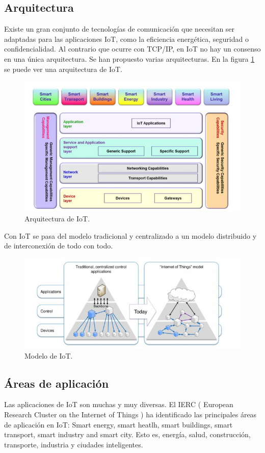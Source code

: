 \documentclass[12pt, twoside]{book}
\begin{document}
\subsection{Arquitectura}
Existe un gran conjunto de tecnologías de comunicación que necesitan ser adaptadas para las aplicaciones IoT, como la eficiencia energética, seguridad o confidencialidad.
Al contrario que ocurre con TCP/IP, en IoT no hay un consenso en una única arquitectura. Se han propuesto varias arquitecturas. En la figura \ref{layered} se puede ver una arquitectura de IoT.  
 \begin{figure}[H]
\centering
\includegraphics[scale=0.4]{images/iot_layered}
\caption{Arquitectura de IoT. \cite{iot_book}}\label{layered}
\end{figure}
Con IoT se pasa del modelo tradicional y centralizado a un modelo distribuido y de interconexión de todo con todo.
 \begin{figure}[H]
\centering
\includegraphics[scale=0.4]{images/model_iot}
\caption{Modelo de IoT. \cite{iot_book}}\label{model}
\end{figure}
\subsection{Áreas de aplicación}
Las aplicaciones de IoT son muchas y muy diversas. El IERC ( European Research Cluster on the Internet of Things ) ha identificado las principales áreas de aplicación en IoT: Smart energy, smart heatlh, smart buildings, smart transport, smart industry and smart city. Esto es, energía, salud, construcción, transporte, industria y ciudades inteligentes.
\end{document}
